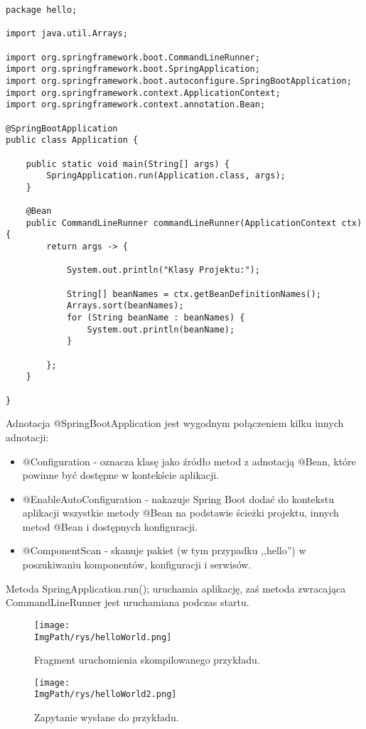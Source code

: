 \documentclass[a4paper,12pt,twoside,openany]{report}
\newcommand{\ImgPath}{.}
\begin{document}
\begin{lstlisting}
package hello;

import java.util.Arrays;

import org.springframework.boot.CommandLineRunner;
import org.springframework.boot.SpringApplication;
import org.springframework.boot.autoconfigure.SpringBootApplication;
import org.springframework.context.ApplicationContext;
import org.springframework.context.annotation.Bean;

@SpringBootApplication
public class Application {

	public static void main(String[] args) {
		SpringApplication.run(Application.class, args);
	}

	@Bean
	public CommandLineRunner commandLineRunner(ApplicationContext ctx) {
		return args -> {

			System.out.println("Klasy Projektu:");

			String[] beanNames = ctx.getBeanDefinitionNames();
			Arrays.sort(beanNames);
			for (String beanName : beanNames) {
				System.out.println(beanName);
			}

		};
	}

}
\end{lstlisting}
Adnotacja @SpringBootApplication jest wygodnym połączeniem kilku innych adnotacji: 
\begin{itemize}
	\item @Configuration - oznacza klasę jako źródło metod z adnotacją @Bean, które powinne być dostępne w kontekście aplikacji.
	\item @EnableAutoConfiguration - nakazuje Spring Boot dodać do kontekstu aplikacji wszystkie metody @Bean na podstawie ścieżki projektu, innych metod @Bean i dostępnych konfiguracji.
	\item @ComponentScan - skanuje pakiet (w tym przypadku ,,hello'') w poszukiwaniu komponentów, konfiguracji i serwisów.
\end{itemize}
Metoda SpringApplication.run(); uruchamia aplikację, zaś metoda zwracająca CommandLineRunner jest uruchamiana podczas startu.
		\begin{figure}[!htbp]
			\begin{center}
				\centering
				\texttt{[image: \\ImgPath/rys/helloWorld.png]}
			\end{center}
			\caption{Fragment uruchomienia skompilowanego przykładu.}
			\label{UMLTS}
		\end{figure}
				\begin{figure}[!htbp]
					\begin{center}
						\centering
						\texttt{[image: \\ImgPath/rys/helloWorld2.png]}
					\end{center}
					\caption{Zapytanie wysłane do przykładu.}
					\label{UMLTS}
				\end{figure}
				
\end{document}
